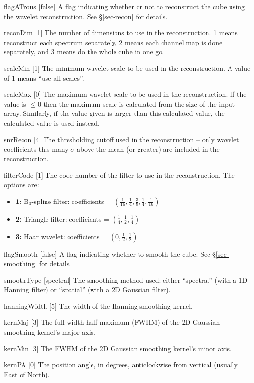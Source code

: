 \begin{Lentry}
\item[{flagATrous [false]}] A flag indicating whether or not to
  reconstruct the cube using the \atrous wavelet
  reconstruction. See \S\ref{sec-recon} for details.
\item[{reconDim [1]}] The number of dimensions to use in the
  reconstruction. 1 means reconstruct each spectrum separately, 2
  means each channel map is done separately, and 3 means do the whole
  cube in one go.
\item[{scaleMin [1]}] The minimum wavelet scale to be used in the
  reconstruction. A value of 1 means ``use all scales''.
\item[{scaleMax [0]}] The maximum wavelet scale to be used in the
  reconstruction. If the value is $\le0$ then the maximum scale is
  calculated from the size of the input array. Similarly, if the value
  given is larger than this calculated value, the calculated value is
  used instead.
\item[{snrRecon [4]}] The thresholding cutoff used in the
  reconstruction -- only wavelet coefficients this many $\sigma$ above
  the mean (or greater) are included in the reconstruction. 
\item[{filterCode [1]}] The code number of the filter to use in
  the reconstruction. The options are:
  \begin{itemize}
  \item \textbf{1:} B$_3$-spline filter: coefficients = 
    $(\frac{1}{16}, \frac{1}{4}, \frac{3}{8}, \frac{1}{4}, \frac{1}{16})$
  \item \textbf{2:} Triangle filter: coefficients = 
    $(\frac{1}{4}, \frac{1}{2}, \frac{1}{4})$
  \item \textbf{3:} Haar wavelet: coefficients = 
    $(0, \frac{1}{2}, \frac{1}{2})$
  \end{itemize}
\end{Lentry}

\begin{Lentry}
\item[{flagSmooth [false]}] A flag indicating whether to
  smooth the cube. See \S\ref{sec-smoothing} for details. 
\item[{smoothType [spectral]}] The smoothing method used: either
  ``spectral'' (with a 1D Hanning filter) or ``spatial'' (with a 2D
  Gaussian filter).  
\item[{hanningWidth [5]}] The width of the Hanning smoothing
  kernel.
\item[{kernMaj [3]}] The full-width-half-maximum (FWHM) of the
  2D Gaussian smoothing kernel's major axis.
\item[{kernMin [3]}] The FWHM of the 2D Gaussian smoothing kernel's
  minor axis.
\item[{kernPA [0]}] The position angle, in degrees,
  anticlockwise from vertical (\ie usually East of North). 
\end{Lentry}


